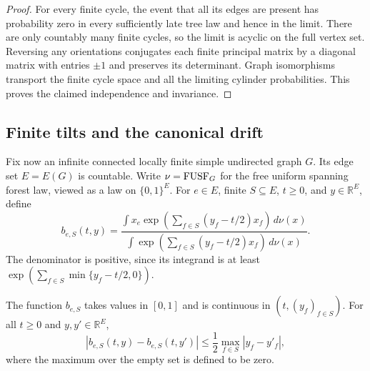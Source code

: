 \begin{proof}
For every finite cycle, the event that all its edges are present has
probability zero in every sufficiently late tree law and hence in the
limit. There are only countably many finite cycles, so the limit is
acyclic on the full vertex set. Reversing any orientations conjugates each
finite principal matrix by a diagonal matrix with entries $\pm1$ and
preserves its determinant. Graph isomorphisms transport the finite cycle
space and all the limiting cylinder probabilities. This proves the claimed
independence and invariance.
\end{proof}

\subsection{Finite tilts and the canonical drift}

Fix now an infinite connected locally finite simple undirected graph
$G$.  Its edge set $E=E(G)$ is countable.  Write
$\nu=\mathrm{FUSF}_G$ for the free uniform spanning forest law, viewed as a law
on $\{0,1\}^{E}$.  For $e\in E$, finite
$S\subseteq E$, $t\ge0$, and $y\in\mathbb R^{E}$, define
\begin{equation}
\label{eq:finite-tilt}
 b_{e,S}(t,y)
 =\frac{\displaystyle
    \int x_e\exp\!\left(\sum_{f\in S}(y_f-t/2)x_f\right)\,d\nu(x)}
   {\displaystyle
    \int \exp\!\left(\sum_{f\in S}(y_f-t/2)x_f\right)\,d\nu(x)}.
\end{equation}
The denominator is positive, since its integrand is at least
$\exp(\sum_{f\in S}\min\{y_f-t/2,0\})$.

\begin{lemma}
\label{lem:forest-response}
The function $b_{e,S}$ takes values in $[0,1]$ and is continuous in
$(t,(y_f)_{f\in S})$.  For all $t\ge0$ and $y,y'\in\mathbb R^{E}$,
\begin{equation}
\label{eq:finite-response}
 |b_{e,S}(t,y)-b_{e,S}(t,y')|
 \le\frac12\max_{f\in S}|y_f-y'_f|,
\end{equation}
where the maximum over the empty set is defined to be zero.
\end{lemma}

